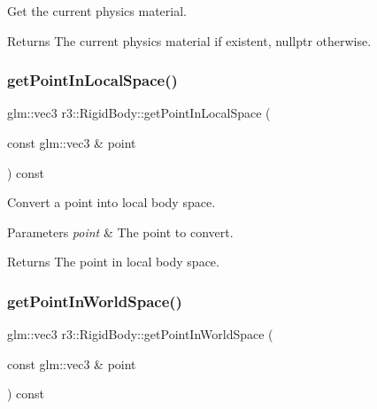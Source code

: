 Get the current physics material. 

\begin{DoxyReturn}{Returns}
The current physics material if existent, nullptr otherwise. 
\end{DoxyReturn}
\mbox{\label{classr3_1_1_rigid_body_a23b72178cb04117c3b016218fefff835}} 
\subsubsection{\texorpdfstring{get\+Point\+In\+Local\+Space()}{getPointInLocalSpace()}}
{\footnotesize\ttfamily glm\+::vec3 r3\+::\+Rigid\+Body\+::get\+Point\+In\+Local\+Space (\begin{DoxyParamCaption}\item[{const glm\+::vec3 \&}]{point }\end{DoxyParamCaption}) const}



Convert a point into local body space. 


\begin{DoxyParams}{Parameters}
{\em point} & The point to convert. \\
\hline
\end{DoxyParams}
\begin{DoxyReturn}{Returns}
The point in local body space. 
\end{DoxyReturn}
\mbox{\label{classr3_1_1_rigid_body_a1d694ab55e5846af2d5a184b2be4c523}} 
\subsubsection{\texorpdfstring{get\+Point\+In\+World\+Space()}{getPointInWorldSpace()}}
{\footnotesize\ttfamily glm\+::vec3 r3\+::\+Rigid\+Body\+::get\+Point\+In\+World\+Space (\begin{DoxyParamCaption}\item[{const glm\+::vec3 \&}]{point }\end{DoxyParamCaption}) const}



